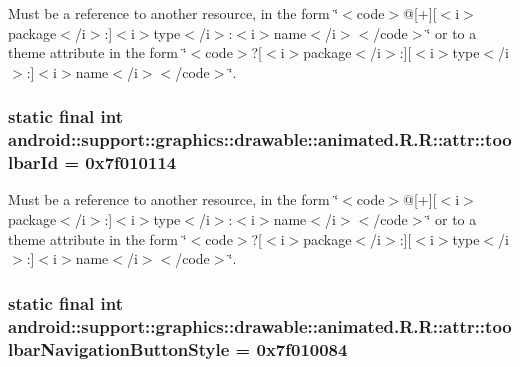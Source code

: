 Must be a reference to another resource, in the form \char`\"{}$<$code$>$@\mbox{[}+\mbox{]}\mbox{[}$<$i$>$package$<$/i$>$:\mbox{]}$<$i$>$type$<$/i$>$:$<$i$>$name$<$/i$>$$<$/code$>$\char`\"{} or to a theme attribute in the form \char`\"{}$<$code$>$?\mbox{[}$<$i$>$package$<$/i$>$:\mbox{]}\mbox{[}$<$i$>$type$<$/i$>$:\mbox{]}$<$i$>$name$<$/i$>$$<$/code$>$\char`\"{}. \hypertarget{classandroid_1_1support_1_1graphics_1_1drawable_1_1animated_1_1_r_1_1attr_6a382612301823d71a5c57b4c8ef3258}{
\subsubsection[{toolbarId}]{\setlength{\rightskip}{0pt plus 5cm}static final int android::support::graphics::drawable::animated.R.R::attr::toolbarId = 0x7f010114}}
\label{classandroid_1_1support_1_1graphics_1_1drawable_1_1animated_1_1_r_1_1attr_6a382612301823d71a5c57b4c8ef3258}


Must be a reference to another resource, in the form \char`\"{}$<$code$>$@\mbox{[}+\mbox{]}\mbox{[}$<$i$>$package$<$/i$>$:\mbox{]}$<$i$>$type$<$/i$>$:$<$i$>$name$<$/i$>$$<$/code$>$\char`\"{} or to a theme attribute in the form \char`\"{}$<$code$>$?\mbox{[}$<$i$>$package$<$/i$>$:\mbox{]}\mbox{[}$<$i$>$type$<$/i$>$:\mbox{]}$<$i$>$name$<$/i$>$$<$/code$>$\char`\"{}. \hypertarget{classandroid_1_1support_1_1graphics_1_1drawable_1_1animated_1_1_r_1_1attr_eada21113396ad844eeb961518ab16ac}{
\subsubsection[{toolbarNavigationButtonStyle}]{\setlength{\rightskip}{0pt plus 5cm}static final int android::support::graphics::drawable::animated.R.R::attr::toolbarNavigationButtonStyle = 0x7f010084}}
\label{classandroid_1_1support_1_1graphics_1_1drawable_1_1animated_1_1_r_1_1attr_eada21113396ad844eeb961518ab16ac}


